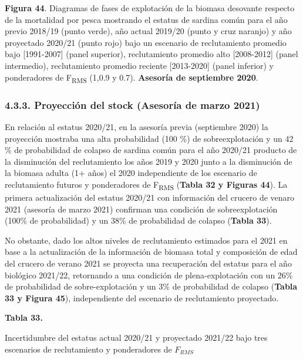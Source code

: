 \documentclass[
  spanish,
]{article}
\begin{document}
\small

\textbf{Figura 44}. Diagramas de fases de explotación de la biomasa
desovante respecto de la mortalidad por pesca mostrando el estatus de
sardina común para el año previo 2018/19 (punto verde), año actual
2019/20 (punto y cruz naranjo) y año proyectado 2020/21 (punto rojo)
bajo un escenario de reclutamiento promedio bajo {[}1991-2007{]} (panel
superior), reclutamiento promedio alto {[}2008-2012{]} (panel
intermedio), reclutamiento promedio reciente {[}2013-2020{]} (panel
inferior) y ponderadores de F\textsubscript{RMS} (1,0.9 y 0.7).
\textbf{Asesoría de septiembre 2020}. \vspace{0.5cm} \normalsize

\pagebreak

\hypertarget{proyecciuxf3n-del-stock-asesoruxeda-de-marzo-2021}{%
\subsubsection{4.3.3. Proyección del stock (Asesoría de marzo
2021)}\label{proyecciuxf3n-del-stock-asesoruxeda-de-marzo-2021}}

En relación al estatus 2020/21, en la asesoría previa (septiembre 2020)
la proyección mostraba una alta probabilidad (100 \%) de
sobreexplotación y un 42 \% de probabilidad de colapso de sardina común
para el año 2020/21 producto de la disminución del reclutamiento los
años 2019 y 2020 junto a la disminución de la biomasa adulta (1+ años)
el 2020 independiente de los escenario de reclutamiento futuros y
ponderadores de F\textsubscript{RMS} (\textbf{Tabla 32 y Figuras 44}).
La primera actualización del estatus 2020/21 con información del crucero
de venaro 2021 (asesoría de marzo 2021) confirman una condición de
sobreexplotación (100\% de probabilidad) y un 38\% de probabilidad de
colapso (\textbf{Tabla 33}).

No obstante, dado los altos niveles de reclutamiento estimados para el
2021 en base a la actualización de la información de biomasa total y
composición de edad del crucero de verano 2021 se proyecta una
recuperación del estatus para el año biológico 2021/22, retornando a una
condición de plena-explotación con un 26\% de probabilidad de
sobre-explotación y un 3\% de probabilidad de colapso (\textbf{Tabla 33
y Figura 45}), independiente del escenario de reclutamiento proyectado.

\vspace{0.5cm}

\small
\begin{center} 
\textbf{Tabla 33.}
\end{center}
\begin{center} 
\vspace{-0.2cm} Incertidumbre del estatus actual 2020/21 y proyectado 2021/22 bajo tres escenarios de reclutamiento y ponderadores de $F_{RMS}$
\end{center}
\vspace{-0.2cm}
\end{document}
